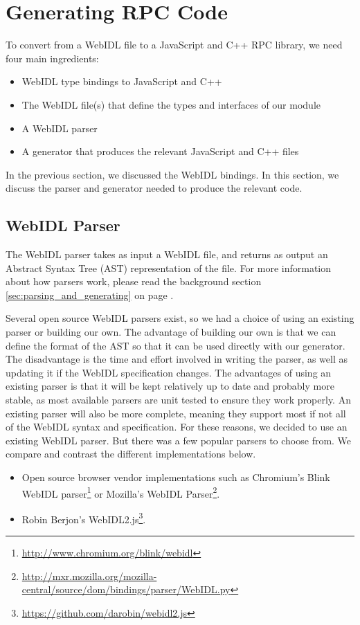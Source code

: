 \section{Generating RPC Code} %
\label{sec:generating_rpc_code}
To convert from a WebIDL file to a JavaScript and C++ RPC library, we need four main ingredients:

\begin{itemize}
	\item WebIDL type bindings to JavaScript and C++
	\item The WebIDL file(s) that define the types and interfaces of our module
	\item A WebIDL parser
	\item A generator that produces the relevant JavaScript and C++ files
\end{itemize}

In the previous section, we discussed the WebIDL bindings. In this section, we discuss the parser and generator needed to produce the relevant code.

\subsection{WebIDL Parser} %
\label{sub:webidl_parser_design}
The WebIDL parser takes as input a WebIDL file, and returns as output an Abstract Syntax Tree (AST) representation of the file. For more information about how parsers work, please read the background section \ref{sec:parsing_and_generating} on page \pageref{sec:parsing_and_generating}. 

Several open source WebIDL parsers exist, so we had a choice of using an existing parser or building our own. The advantage of building our own is that we can define the format of the AST so that it can be used directly with our generator. The disadvantage is the time and effort involved in writing the parser, as well as updating it if the WebIDL specification changes. The advantages of using an existing parser is that it will be kept relatively up to date and probably more stable, as most available parsers are unit tested to ensure they work properly. An existing parser will also be more complete, meaning they support most if not all of the WebIDL syntax and specification. For these reasons, we decided to use an existing WebIDL parser. But there was a few popular parsers to choose from. We compare and contrast the different implementations below.

\begin{itemize}
	\item Open source browser vendor implementations such as Chromium's Blink WebIDL parser\footnote{\url{http://www.chromium.org/blink/webidl}} or Mozilla's WebIDL Parser\footnote{\url{http://mxr.mozilla.org/mozilla-central/source/dom/bindings/parser/WebIDL.py}}.
	\item Robin Berjon's WebIDL2.js\footnote{\url{https://github.com/darobin/webidl2.js}}.
\end{itemize}

